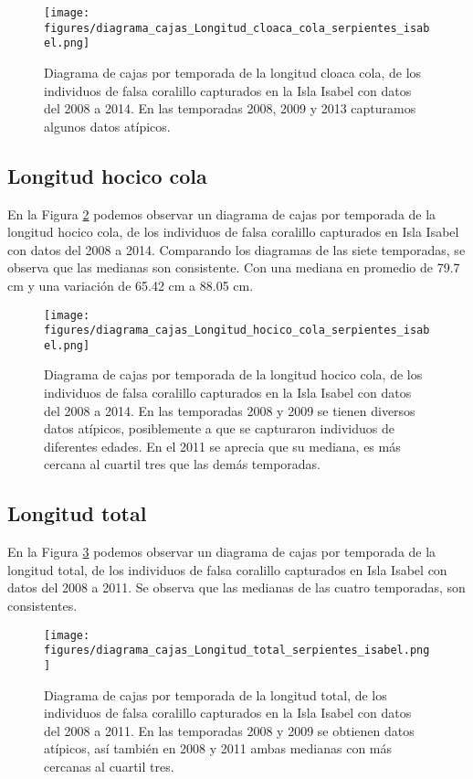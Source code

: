 \documentclass{article}
\begin{document}
\begin{figure}[H]
\centering
\texttt{[image: figures/diagrama\_cajas\_Longitud\_cloaca\_cola\_serpientes\_isabel.png]}
\caption{Diagrama de cajas por temporada de la longitud cloaca cola, de los individuos de falsa coralillo capturados en la Isla Isabel con datos del 2008 a 2014. En las temporadas 2008, 2009 y 2013 capturamos algunos datos atípicos.}
\label{fig:pngBoxsplotLongitudCloacaCola}
\end{figure}

\subsection*{Longitud hocico cola}
En la Figura \ref{fig:pngBoxsplotLongitudHocicoCola} podemos observar un diagrama de cajas por
temporada de la longitud hocico cola, de los individuos de falsa coralillo capturados en Isla
Isabel con datos del 2008 a 2014. Comparando los diagramas de las siete temporadas, se observa  que
las medianas son consistente. Con una mediana en promedio de 79.7 cm y una variación de 65.42 cm a
88.05 cm. 

\begin{figure}[H]
\centering
\texttt{[image: figures/diagrama\_cajas\_Longitud\_hocico\_cola\_serpientes\_isabel.png]}
\caption{Diagrama de cajas por temporada de la longitud hocico cola, de los individuos de falsa coralillo capturados en la Isla Isabel con datos del 2008 a 2014. En las temporadas 2008 y 2009 se tienen diversos datos atípicos, posiblemente a que se capturaron individuos de diferentes edades. En el 2011 se aprecia que su mediana, es más cercana al cuartil tres que las demás temporadas.}
\label{fig:pngBoxsplotLongitudHocicoCola}
\end{figure}

\subsection*{Longitud total}
En la Figura \ref{fig:pngBoxsplotLongitudTotal} podemos observar un diagrama de cajas por temporada
de la longitud total, de los individuos de falsa coralillo capturados en Isla Isabel con datos
del 2008 a 2011. Se observa que las medianas de las cuatro temporadas, son consistentes.  

\begin{figure}[H]
\centering
\texttt{[image: figures/diagrama\_cajas\_Longitud\_total\_serpientes\_isabel.png]}
\caption{Diagrama de cajas por temporada de la longitud total, de los individuos de falsa coralillo capturados en la Isla Isabel con datos del 2008 a 2011. En las temporadas 2008 y 2009 se obtienen datos atípicos, así también en 2008 y 2011 ambas medianas con más cercanas al cuartil tres.}
\label{fig:pngBoxsplotLongitudTotal}
\end{figure}
\end{document}
